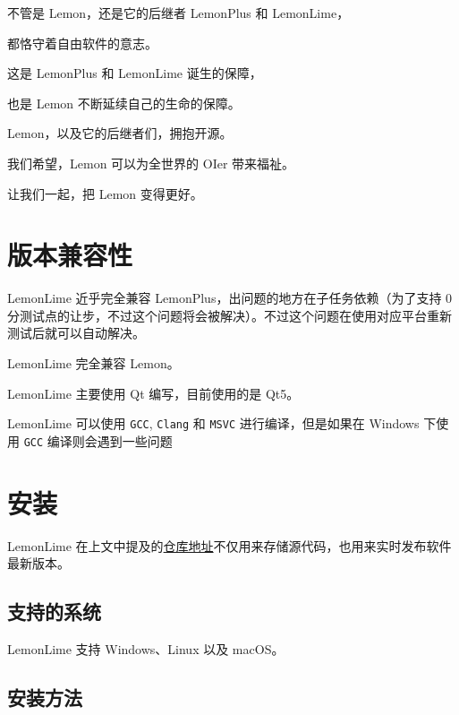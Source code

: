 \documentclass[UTF-8]{ctexart}
\begin{document}
    不管是 Lemon，还是它的后继者 LemonPlus 和 LemonLime，

    都恪守着自由软件的意志。

    这是 LemonPlus 和 LemonLime 诞生的保障，

    也是 Lemon 不断延续自己的生命的保障。\newline

    \begin{center}

        Lemon，以及它的后继者们，拥抱开源。

        我们希望，Lemon 可以为全世界的 OIer 带来福祉。

        让我们一起，把 Lemon 变得更好。

    \end{center}

    \newpage

    \section{版本兼容性}

    LemonLime 近乎完全兼容 LemonPlus，出问题的地方在子任务依赖（为了支持 0 分测试点的让步，不过这个问题将会被解决）。不过这个问题在使用对应平台重新测试后就可以自动解决。

    LemonLime 完全兼容 Lemon。

    LemonLime 主要使用 Qt 编写，目前使用的是 Qt5。

    LemonLime 可以使用 \texttt{GCC}, \texttt{Clang} 和 \texttt{MSVC} 进行编译，但是如果在 Windows 下使用 \texttt{GCC} 编译则会遇到一些问题

    \newpage

    \section{安装}

    LemonLime 在上文中提及的\href{https://github.com/Project-LemonLime/Project_LemonLime}{仓库地址}不仅用来存储源代码，也用来实时发布软件最新版本。

    \subsection{支持的系统}

    LemonLime 支持 Windows、Linux 以及 macOS。

    \subsection{安装方法}
\end{document}
